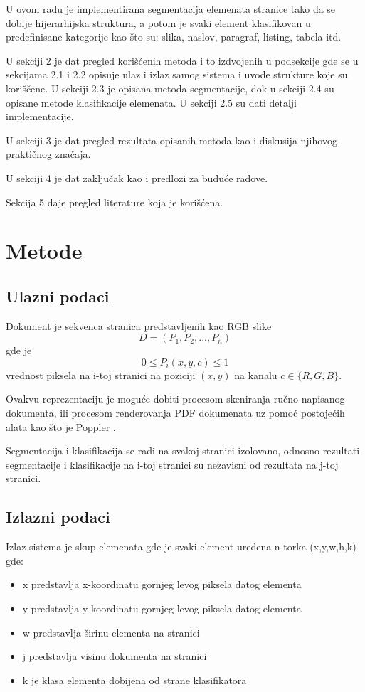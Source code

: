 \documentclass[]{amsart}
\begin{document}
U ovom radu je implementirana segmentacija elemenata stranice tako da se dobije hijerarhijska struktura, a potom je svaki element klasifikovan u predefinisane kategorije
kao što su: slika, naslov, paragraf, listing, tabela itd.

U sekciji 2 je dat pregled korišćenih metoda i to izdvojenih u podsekcije gde se u sekcijama 2.1 i 2.2 opisuje ulaz i izlaz samog sistema i uvode strukture koje su
koriščene. U sekciji 2.3 je opisana metoda segmentacije, dok u sekciji 2.4 su opisane metode klasifikacije elemenata. U sekciji 2.5 su dati detalji implementacije.

U sekciji 3 je dat pregled rezultata opisanih metoda kao i diskusija njihovog praktičnog značaja.

U sekciji 4 je dat zaključak kao i predlozi za buduće radove.

Sekcija 5 daje pregled literature koja je korišćena. 



\section{Metode}
\label{sec:orgdf3095c}
\subsection{Ulazni podaci}
\label{sec:org36199a1}

Dokument je sekvenca stranica predstavljenih kao RGB slike $$ D = (P_1, P_2, ..., P_n) $$ gde je $$ 0 \le P_{i}(x,y, c) \le 1$$ vrednost piksela na i-toj stranici na poziciji $ (x,y) $  na kanalu $ c \in \{R, G, B\}$.

Ovakvu reprezentaciju je moguće dobiti procesom skeniranja ručno napisanog dokumenta, 
ili procesom renderovanja PDF dokumenata uz pomoć postojećih alata kao što je Poppler \cite{poppler}.


Segmentacija i klasifikacija se radi na svakoj stranici izolovano, odnosno rezultati segmentacije i klasifikacije na i-toj stranici su nezavisni od rezultata na j-toj
stranici.


\subsection{Izlazni podaci}
\label{sec:org75e117b}

Izlaz sistema je skup elemenata gde je svaki element uređena n-torka (x,y,w,h,k) gde:

\begin{itemize}
\item x predstavlja x-koordinatu gornjeg levog piksela datog elementa
\item y predstavlja y-koordinatu gornjeg levog piksela datog elementa
\item w predstavlja širinu elementa na stranici
\item j predstavlja visinu dokumenta na stranici
\item k je klasa elementa dobijena od strane klasifikatora
\end{itemize}
\end{document}
